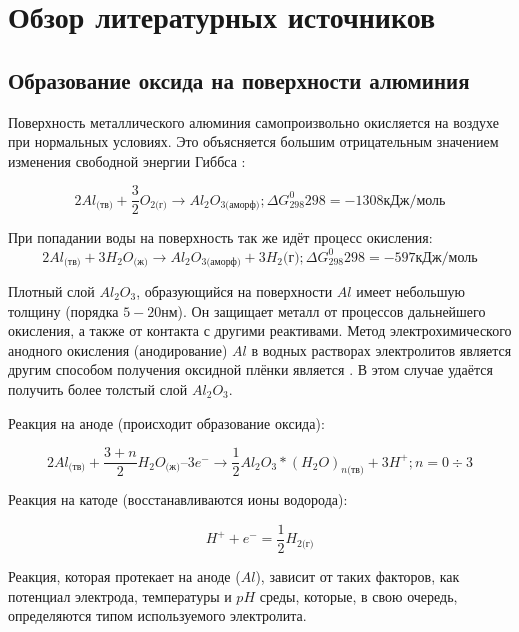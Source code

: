 \section{Обзор литературных источников}

\subsection{Образование оксида на поверхности алюминия}

Поверхность металлического алюминия самопроизвольно окисляется на воздухе при нормальных условиях. Это объясняется большим отрицательным значением изменения свободной энергии Гиббса \cite{atraschenko-hyperbolyc}:

\begin{equation}
2Al_\text{(тв)} + \frac{3}{2}O_{2\text{(г)}}\to Al_2O_{3\text{(аморф)}};  \Delta G^0_{298}298=−1308\text{кДж/моль}
\end{equation}

При попадании воды на поверхность так же идёт процесс окисления:
\begin{equation}
2Al_\text{(тв)} + 3H_2O_\text{(ж)}\to Al_2O_{3\text{(аморф)}}+3H_2\text{(г)};  \Delta G^0_{298}298=−597 \text{кДж/моль}
\end{equation}

Плотный слой $Al_2O_3$, образующийся на поверхности $Al$ имеет небольшую толщину (порядка $5-20$нм). Он защищает металл от процессов дальнейшего окисления, а также от контакта с другими реактивами. Метод электрохимического анодного окисления (анодирование) $Al$ в водных растворах электролитов является другим способом получения оксидной плёнки является \cite{atraschenko-hyperbolyc}. В этом случае удаётся получить более толстый слой $Al_2O_3$.

Реакция на аноде (происходит образование оксида):

\begin{equation}
2Al_\text{(тв)} + \frac{3+n}{2}H_2O_\text{(ж)}–3e^-\to \frac{1}{2}Al_2O_3*(H_2O)_{n\text{(тв)}}+3H^+; n=0÷3    
\end{equation}

Реакция на катоде (восстанавливаются ионы водорода):

\begin{equation}
H^++e^-=\frac{1}{2}H_{2\text{(г)}}  
\end{equation}

Реакция, которая протекает на аноде ($Al$), зависит от таких факторов, как потенциал электрода, температуры и $pH$ среды, которые, в свою очередь, определяются типом используемого электролита.

